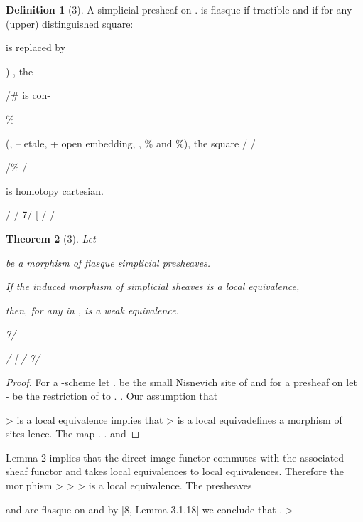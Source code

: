 \documentclass[11pt,a4paper]{article}
\theoremstyle{plain}
\newtheorem{theorem}{Theorem}
\theoremstyle{definition}
\newtheorem{definition}[theorem]{Definition}
\begin{document}
\begin{definition}[3]
A simplicial presheaf  on
.   is flasque if
tractible and if for any (upper) distinguished square:

  



is replaced by


) , the

/\# is con-




\% 

(, -- etale, + open embedding,
, \% and      \%), the square
/  / 










/\% 
/ 

is homotopy cartesian.

 / /
7/
 [ /  / 


\end{definition}

\begin{theorem}[3]
Let

 be a morphism of flasque simplicial presheaves.

If the induced morphism of simplicial sheaves 
 is a local equivalence,

then, for any in
, 
is a weak equivalence.


7/


 
/ [  /
7/
 




\end{theorem}

\begin{proof} For a -scheme
let .   be the small Nisnevich site of
and for a
presheaf on
let - be the restriction of to .   . Our assumption that



>
 is a local equivalence implies that
> is a local equivadefines a morphism of sites
lence. The map
. 
.   and
\end{proof}

Lemma 2 implies that the direct image functor
commutes with the associated
sheaf functor and takes local equivalences to local equivalences. Therefore the mor
phism
>
>
> is a local equivalence. The presheaves

and
are
flasque
on
and
by
[8,
Lemma
3.1.18]
we
conclude
that
. 
>
\end{document}
